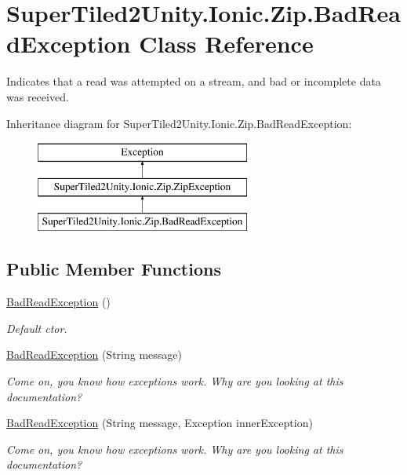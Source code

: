 \hypertarget{class_super_tiled2_unity_1_1_ionic_1_1_zip_1_1_bad_read_exception}{}\section{Super\+Tiled2\+Unity.\+Ionic.\+Zip.\+Bad\+Read\+Exception Class Reference}
\label{class_super_tiled2_unity_1_1_ionic_1_1_zip_1_1_bad_read_exception}


Indicates that a read was attempted on a stream, and bad or incomplete data was received.  


Inheritance diagram for Super\+Tiled2\+Unity.\+Ionic.\+Zip.\+Bad\+Read\+Exception\+:\begin{figure}[H]
\begin{center}
\leavevmode
\includegraphics[height=3.000000cm]{class_super_tiled2_unity_1_1_ionic_1_1_zip_1_1_bad_read_exception}
\end{center}
\end{figure}
\subsection*{Public Member Functions}
\begin{DoxyCompactItemize}
\item 
\mbox{\hyperlink{class_super_tiled2_unity_1_1_ionic_1_1_zip_1_1_bad_read_exception_aba59d0343716cfacfe3163ae09738e1b}{Bad\+Read\+Exception}} ()
\begin{DoxyCompactList}\small\item\em Default ctor. \end{DoxyCompactList}\item 
\mbox{\hyperlink{class_super_tiled2_unity_1_1_ionic_1_1_zip_1_1_bad_read_exception_ad1dc2301cd19da243966c9380656a189}{Bad\+Read\+Exception}} (String message)
\begin{DoxyCompactList}\small\item\em Come on, you know how exceptions work. Why are you looking at this documentation? \end{DoxyCompactList}\item 
\mbox{\hyperlink{class_super_tiled2_unity_1_1_ionic_1_1_zip_1_1_bad_read_exception_ad568b39358f5957237f51035151f03f4}{Bad\+Read\+Exception}} (String message, Exception inner\+Exception)
\begin{DoxyCompactList}\small\item\em Come on, you know how exceptions work. Why are you looking at this documentation? \end{DoxyCompactList}\end{DoxyCompactItemize}
